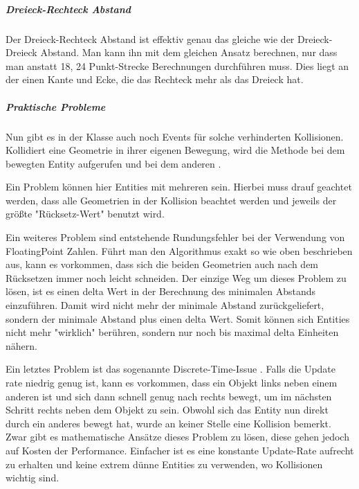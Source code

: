 \subparagraph{Dreieck-Rechteck Abstand}

Der Dreieck-Rechteck Abstand ist effektiv genau das gleiche wie der Dreieck-Dreieck Abstand. Man kann ihn mit dem gleichen Ansatz berechnen, nur dass man anstatt 18, 24 Punkt-Strecke Berechnungen durchführen muss. Dies liegt an der einen Kante und Ecke, die das Rechteck mehr als das Dreieck hat.

\subparagraph{Praktische Probleme}

Nun gibt es in der Klasse  auch noch Events für solche verhinderten Kollisionen. Kollidiert eine Geometrie in ihrer eigenen Bewegung, wird die Methode  bei dem bewegten Entity aufgerufen und bei dem anderen .

Ein Problem können hier Entities mit mehreren  sein. Hierbei muss drauf geachtet werden, dass alle Geometrien in der Kollision beachtet werden und jeweils der größte "Rücksetz-Wert" benutzt wird.

Ein weiteres Problem sind entstehende Rundungsfehler bei der Verwendung von FloatingPoint Zahlen. Führt man den Algorithmus exakt so wie oben beschrieben aus, kann es vorkommen, dass sich die beiden Geometrien auch nach dem Rücksetzen immer noch leicht schneiden. Der einzige Weg um dieses Problem zu lösen, ist es einen delta Wert in der Berechnung des minimalen Abstands einzuführen.\cite[S 18]{KRAY} Damit wird nicht mehr der minimale Abstand zurückgeliefert, sondern der minimale Abstand plus einen delta Wert. Somit können sich Entities nicht mehr "wirklich" berühren, sondern nur noch bis maximal delta Einheiten nähern.

Ein letztes Problem ist das sogenannte Discrete-Time-Issue \cite[S 503]{DGIJ}  \cite[S 14]{ACP}. Falls die Update rate niedrig genug ist, kann es vorkommen, dass ein Objekt links neben einem anderen ist und sich dann schnell genug nach rechts bewegt, um im nächsten Schritt rechts neben dem Objekt zu sein. Obwohl sich das Entity nun direkt durch ein anderes bewegt hat, wurde an keiner Stelle eine Kollision bemerkt. Zwar gibt es mathematische Ansätze dieses Problem zu lösen, diese gehen jedoch auf Kosten der Performance.\cite[S 11ff]{KRAY} Einfacher ist es eine konstante Update-Rate aufrecht zu erhalten und keine extrem dünne Entities zu verwenden, wo Kollisionen wichtig sind.


